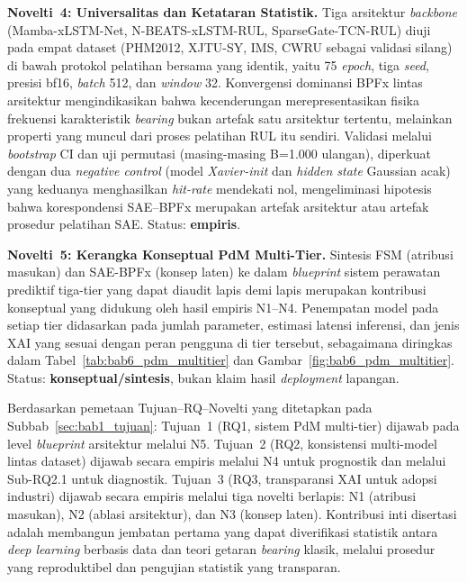 \textbf{Novelti~4: Universalitas dan Ketataran Statistik.} Tiga arsitektur
\emph{backbone} (Mamba-xLSTM-Net, N-BEATS-xLSTM-RUL, SparseGate-TCN-RUL)
diuji pada empat dataset (PHM2012, XJTU-SY, IMS, CWRU sebagai validasi
silang) di bawah protokol pelatihan bersama yang identik, yaitu 75
\emph{epoch}, tiga \emph{seed}, presisi bf16, \emph{batch} 512, dan
\emph{window} 32. Konvergensi dominansi BPFx lintas arsitektur
mengindikasikan bahwa kecenderungan merepresentasikan fisika frekuensi
karakteristik \emph{bearing} bukan artefak satu arsitektur tertentu, melainkan
properti yang muncul dari proses pelatihan RUL itu sendiri. Validasi melalui
\emph{bootstrap} CI dan uji permutasi (masing-masing B=1.000 ulangan),
diperkuat dengan dua \emph{negative control} (model \emph{Xavier-init} dan
\emph{hidden state} Gaussian acak) yang keduanya menghasilkan \emph{hit-rate}
mendekati nol, mengeliminasi hipotesis bahwa korespondensi SAE--BPFx
merupakan artefak arsitektur atau artefak prosedur pelatihan SAE.
Status: \textbf{empiris}.

\textbf{Novelti~5: Kerangka Konseptual PdM Multi-Tier.} Sintesis FSM
(atribusi masukan) dan SAE-BPFx (konsep laten) ke dalam \emph{blueprint}
sistem perawatan prediktif tiga-tier yang dapat diaudit lapis demi lapis
merupakan kontribusi konseptual yang didukung oleh hasil empiris N1--N4.
Penempatan model pada setiap tier didasarkan pada jumlah parameter, estimasi
latensi inferensi, dan jenis XAI yang sesuai dengan peran pengguna di tier
tersebut, sebagaimana diringkas dalam Tabel~\ref{tab:bab6_pdm_multitier} dan
Gambar~\ref{fig:bab6_pdm_multitier}. Status: \textbf{konseptual/sintesis},
bukan klaim hasil \emph{deployment} lapangan.

Berdasarkan pemetaan Tujuan--RQ--Novelti yang ditetapkan pada
Subbab~\ref{sec:bab1_tujuan}: Tujuan~1 (RQ1, sistem PdM multi-tier)
dijawab pada level \emph{blueprint} arsitektur melalui N5. Tujuan~2
(RQ2, konsistensi multi-model lintas dataset) dijawab secara empiris melalui
N4 untuk prognostik dan melalui Sub-RQ2.1 untuk diagnostik. Tujuan~3
(RQ3, transparansi XAI untuk adopsi industri) dijawab secara empiris melalui
tiga novelti berlapis: N1 (atribusi masukan), N2 (ablasi arsitektur), dan N3
(konsep laten). Kontribusi inti disertasi adalah membangun jembatan pertama
yang dapat diverifikasi statistik antara \emph{deep learning} berbasis data
dan teori getaran \emph{bearing} klasik, melalui prosedur yang reproduktibel dan
pengujian statistik yang transparan.

